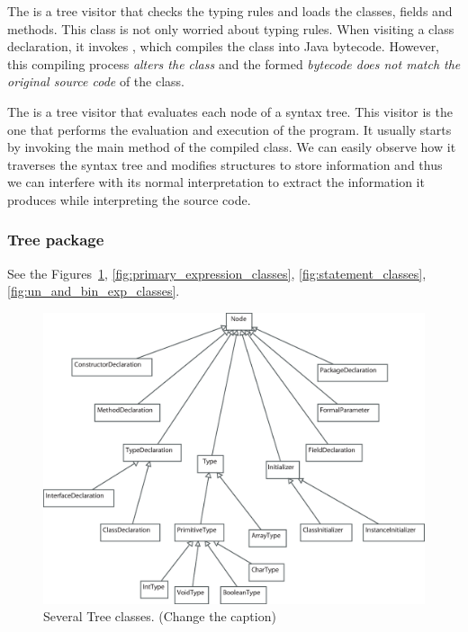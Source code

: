 The  is a tree visitor that checks the typing rules and loads the
classes, fields and methods. This  class is not only worried
about typing rules. When visiting a class declaration, it invokes
, which compiles the class into Java bytecode. However, this
compiling process \textit{alters the class} and the formed \textit{bytecode
does not match the original source code} of the class.

The  is a tree visitor that evaluates each node of
a syntax tree. This visitor is the one that performs the evaluation and
execution of the program. It usually starts by invoking the main method
of the compiled class. We can easily observe how it traverses
the syntax tree and modifies \djava{} structures to store information
and thus we can interfere with its normal interpretation to extract
the information it produces while interpreting the source code.

\subsubsection{Tree package}
\label{sec:Tree_package}

See the Figures~\ref{fig:several_tree_classes},
\ref{fig:primary_expression_classes}, \ref{fig:statement_classes},
\ref{fig:un_and_bin_exp_classes}.

\begin{figure}[!htb]
\begin{center}
\includegraphics[width=\textwidth]{images/several.eps}
\caption{Several Tree classes. (Change the caption)}
\label{fig:several_tree_classes}
\end{center}
\end{figure}

